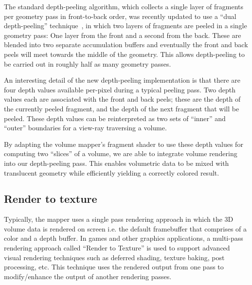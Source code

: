 The standard depth-peeling algorithm, which collects a single layer of fragments
per geometry pass in front-to-back order, was recently updated to use a ``dual
depth-peeling'' technique~\citep{bavoil_order_2008}, in which two layers of
fragments are peeled in a single geometry pass: One layer from the front and a
second from the back. These are blended into two separate accumulation buffers
and eventually the front and back peels will meet towards the middle of the
geometry. This allows depth-peeling to be carried out in roughly half as many
geometry passes.

An interesting detail of the new depth-peeling implementation is that there are
four depth values available per-pixel during a typical peeling pass. Two depth
values each are associated with the front and back peels; these are the depth of
the currently peeled fragment, and the depth of the next fragment that will be
peeled. These depth values can be reinterpreted as two sets of ``inner'' and
``outer'' boundaries for a view-ray traversing a volume.

By adapting the volume mapper's fragment shader to use these depth values for
computing two ``slices'' of a volume, we are able to integrate volume rendering
into our depth-peeling pass. This enables volumetric data to be mixed with
translucent geometry while efficiently yielding a correctly colored result.

\subsection{Render to texture}
Typically, the mapper uses a single pass
rendering approach in which the 3D volume data is rendered on screen i.e. the
default framebuffer that comprises of a color and a depth buffer. In games and
other graphics applications, a multi-pass rendering approach called ``Render to
Texture'' is used to support advanced visual rendering techniques such as
deferred shading, texture baking, post processing, etc. This technique uses the
rendered output from one pass to modify/enhance the output of another rendering
passes.

